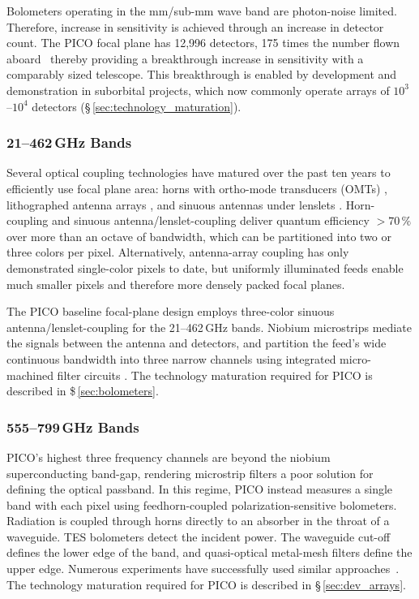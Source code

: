 Bolometers operating in the mm/sub-mm wave band are photon-noise limited. Therefore, increase in sensitivity is achieved through an increase in detector count. The PICO focal plane has 12,996 detectors, 175 times the number flown aboard \planck\ thereby providing a breakthrough increase in sensitivity with a comparably sized telescope. This breakthrough is enabled by development and demonstration in suborbital projects, which now commonly operate arrays of $10^3$--$10^4$ detectors (\S\,\ref{sec:technology_maturation}).

\subsubsection{21--462\,GHz Bands}
\label{sec:low_freq_det} %


Several optical coupling technologies have matured over the past ten
years to efficiently use focal plane area: horns with ortho-mode
transducers (OMTs) \citep{Duff2016}, lithographed antenna arrays
\citep{BICEP2015}, and sinuous antennas under lenslets
\citep{Edwards2012}. Horn-coupling and sinuous
antenna/lenslet-coupling deliver quantum efficiency $>70\,\%$ over
more than an octave of bandwidth, which can be partitioned into two
or three colors per pixel.  Alternatively, antenna-array coupling has
only demonstrated single-color pixels to date, but uniformly
illuminated feeds enable much smaller pixels and therefore more
densely packed focal planes.

The PICO baseline focal-plane design
employs three-color sinuous antenna/lenslet-coupling \citep{Suzuki2014}
for the 21--462\,GHz bands. Niobium microstrips mediate the signals
between the antenna and detectors, and partition the feed's wide
continuous bandwidth into three narrow channels using integrated
micro-machined filter circuits \citep{OBrient2013}. The technology
maturation required for PICO is described in \$\,\ref{sec:bolometers}.

\subsubsection{555--799\,GHz Bands}
\label{sec:high_freq_det} %
%

PICO's highest three frequency channels are beyond the niobium superconducting band-gap, rendering microstrip filters a poor solution for defining the optical passband. In this regime, PICO instead measures a single band with each pixel using feedhorn-coupled polarization-sensitive bolometers. Radiation is coupled through horns directly to an absorber in the throat of a waveguide. TES bolometers detect the incident power.  The waveguide cut-off defines the lower edge of the band, and quasi-optical metal-mesh filters define the upper edge. Numerous experiments have successfully used similar approaches~\citep{Shirokoff2011,Bleem2012,Turner2001}. The technology maturation required for PICO is described in \S\,\ref{sec:dev_arrays}.

